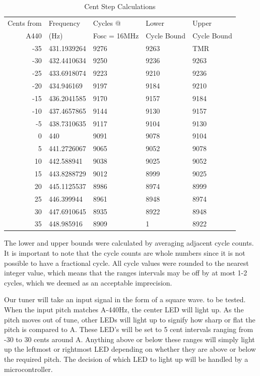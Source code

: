 \documentclass[12pt]{article}
\begin{document}
\begin{table}
   \centering
    \begin{tabular}{|r|l|l|l|l|}
        \hline
        Cents from & Frequency& Cycles @ & Lower & Upper \\
        A440 & (Hz) & Fosc = 16MHz & Cycle Bound & Cycle Bound \\ \hline
       -35 & 431.1939264 & 9276 & 9263 & TMR \\ \hline
       -30 & 432.4410634 & 9250 & 9236 & 9263 \\ \hline
       -25 & 433.6918074 & 9223 & 9210 & 9236 \\ \hline
       -20 & 434.946169 & 9197 & 9184 & 9210 \\ \hline
       -15 & 436.2041585 & 9170 & 9157 & 9184 \\ \hline
       -10 & 437.4657865 & 9144 & 9130 & 9157 \\ \hline
       -5 & 438.7310635 & 9117 & 9104 & 9130 \\ \hline
       0 & 440 & 9091 & 9078 & 9104 \\ \hline
       5 & 441.2726067 & 9065 & 9052 & 9078 \\ \hline
       10 & 442.588941 & 9038 & 9025 & 9052 \\ \hline
       15 & 443.8288729 & 9012 & 8999 & 9025 \\ \hline
       20 & 445.1125537 & 8986 & 8974 & 8999 \\ \hline
       25 & 446.399944 & 8961 & 8948 & 8974 \\ \hline
       30 & 447.6910645 & 8935 & 8922 & 8948 \\ \hline
       35 & 448.985916 & 8909 & 1 & 8922 \\ \hline
    \end{tabular}
	\caption{Cent Step Calculations}
	\label{Freq_Table} 
\end{table}

The lower and upper bounds were calculated by averaging adjacent cycle counts. It is important to
note that the cycle counts are whole numbers since it is not possible to have a fractional cycle. All cycle
values were rounded to the nearest integer value, which means that the ranges intervals may be off by
at most 1-2 cycles, which we deemed as an acceptable imprecision.



Our tuner will take an input signal in the form of a square wave. to be tested. When the input pitch matches A-440Hz, the
center LED will light up. As the pitch moves out of tune, other LEDs will light up to signify how sharp or
flat the pitch is compared to A. These LED's will be set to 5 cent intervals ranging from -30 to 30 cents
around A. Anything above or below these ranges will simply light up the leftmost or rightmost LED
depending on whether they are above or below the required pitch. The decision of which LED to light up
will be handled by a microcontroller.
\end{document}
